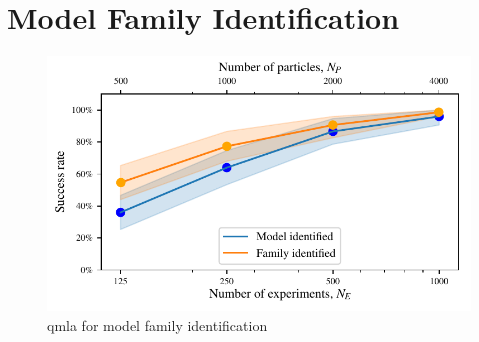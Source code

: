\section{Model Family Identification}\label{sec:family_identification}


\begin{figure}[t]
    \begin{center}
        \includegraphics{theoretical_study/figures/model_family_search.pdf}
    \end{center}
    \label{fig:family_identification}
    \caption[\gls{qmla} for model family identification]{
        \gls{qmla} for model family identification
    }

\end{figure}
